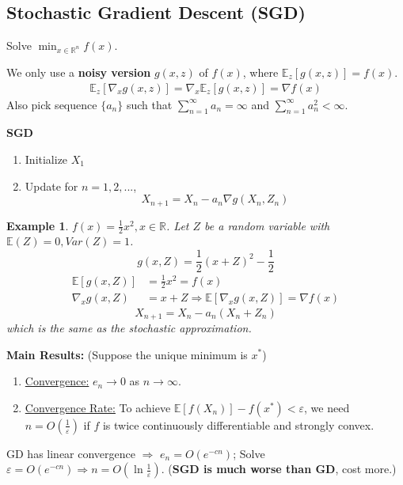 \documentclass[11pt,a4paper]{article}
\newtheorem{example}{Example}
\begin{document}
\subsection{Stochastic Gradient Descent (SGD)}
Solve $\min_{x\in\mathbb{R}^n}f(x)$.

We only use a \textbf{noisy version} $g(x,z)$ of $f(x)$, where $\mathbb{E}_z[g(x,z)]=f(x)$.
\begin{equation}
    \begin{aligned}
        \mathbb{E}_z[\nabla_x g(x,z)]=\nabla_x \mathbb{E}_z[g(x,z)]=\nabla f(x)
    \end{aligned}
    \nonumber
\end{equation}
Also pick sequence $\{a_n\}$ such that $\sum_{n=1}^\infty a_n=\infty$ and $\sum_{n=1}^\infty a^2_n<\infty$.

\textbf{SGD}
\begin{enumerate}[$\bullet$]
    \item Initialize $X_1$
    \item Update for $n=1,2,...$, $$X_{n+1}=X_n-a_n \nabla g(X_n,Z_n)$$
\end{enumerate}

\begin{example}
    $f(x)=\frac{1}{2}x^2,x\in \mathbb{R}$. Let $Z$ be a random variable with $\mathbb{E}(Z)=0,Var(Z)=1$. $$g(x,Z)=\frac{1}{2}(x+Z)^2-\frac{1}{2}$$
    \begin{equation}
        \begin{aligned}
            \mathbb{E}[g(x,Z)]&=\frac{1}{2}x^2=f(x)\\
            \nabla_x g(x,Z)&=x+Z \Rightarrow 
            \mathbb{E}[\nabla_xg(x,Z)]=\nabla f(x)
        \end{aligned}
        \nonumber
    \end{equation}
    $$X_{n+1}=X_n-a_n(X_n+Z_n)$$
    which is the same as the stochastic approximation.
\end{example}
\textbf{Main Results:} (Suppose the unique minimum is $x^*$)
\begin{enumerate}[(1)]
    \item \underline{Convergence:} $e_n \rightarrow 0$ as $n \rightarrow \infty$.
    \item \underline{Convergence Rate:} To achieve $\mathbb{E}[f(X_n)]-f(x^*)<\varepsilon$, we need $n=O(\frac{1}{\varepsilon})$ if $f$ is twice continuously differentiable and strongly convex.
\end{enumerate}

GD has linear convergence $\Rightarrow$ $e_n=O(e^{-cn})$; Solve $\varepsilon=O(e^{-cn}) \Rightarrow n=O(\ln \frac{1}{\varepsilon})$. (\textbf{SGD is much worse than GD}, cost more.)
\end{document}
